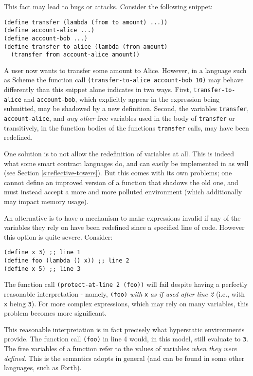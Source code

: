 This fact may lead to bugs or attacks. Consider the following snippet:

\begin{verbatim}
(define transfer (lambda (from to amount) ...))
(define account-alice ...)
(define account-bob ...)
(define transfer-to-alice (lambda (from amount)
  (transfer from account-alice amount))
\end{verbatim}

A user now wants to transfer some amount to Alice. However, in a language such
as Scheme the function call \texttt{(transfer-to-alice account-bob 10)} may
behave differently than this snippet alone indicates in two ways. First,
\texttt{transfer-to-alice} and \texttt{account-bob}, which explicitly appear in
the expression being submitted, may be shadowed by a new definition. Second, the
variables \texttt{transfer}, \texttt{account-alice}, and \emph{any other} free
variables used in the body of \texttt{transfer} or transitively, in the function
bodies of the functions \texttt{transfer} calls, may have been redefined.

One solution is to not allow the redefinition of variables at all. This is
indeed what some smart contract languages do, and can easily be implemented in
\rad as well (see Section \ref{s:reflective-towers}). But this comes with its
own problems; one cannot define an improved version of a function that shadows
the old one, and must instead accept a more and more polluted environment (which
additionally may impact memory usage).

An alternative is to have a mechanism to make expressions invalid if any of the
variables they rely on have been redefined since a specified line of code.
However this option is quite severe. Consider:

\begin{verbatim}
(define x 3) ;; line 1
(define foo (lambda () x)) ;; line 2
(define x 5) ;; line 3
\end{verbatim}

The function call \texttt{(protect-at-line 2 (foo))} will fail despite having a
perfectly reasonable interpretation - namely, \texttt{(foo)} \emph{with}
\texttt{x} \emph{as if used after line 2} (i.e., with \texttt{x} being
\texttt{3}). For more complex expressions, which may rely on many variables,
this problem becomes more significant.

This reasonable interpretation is in fact precisely what hyperstatic
environments provide. The function call \texttt{(foo)} in line 4 would, in this
model, still evaluate to \texttt{3}. The free variables of a function refer to
the values of variables \emph{when they were defined}. This is the semantics
\rad adopts in general (and can be found in some other languages, such as
Forth).

